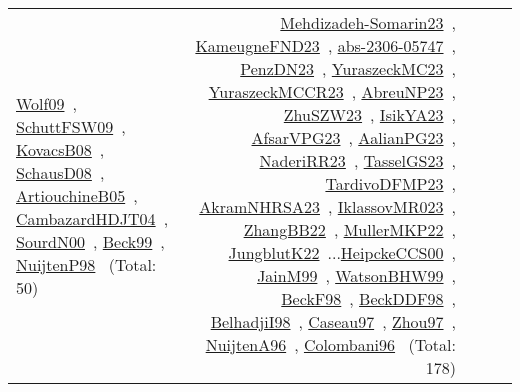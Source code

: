 {\begin{longtable}{p{3cm}r>{\raggedright\arraybackslash}p{6cm}>{\raggedright\arraybackslash}p{6cm}>{\raggedright\arraybackslash}p{8cm}}
\href{../works/Wolf09.pdf}{Wolf09}~\cite{Wolf09}, \href{../works/SchuttFSW09.pdf}{SchuttFSW09}~\cite{SchuttFSW09}, \href{../works/KovacsB08.pdf}{KovacsB08}~\cite{KovacsB08}, \href{../works/SchausD08.pdf}{SchausD08}~\cite{SchausD08}, \href{../works/ArtiouchineB05.pdf}{ArtiouchineB05}~\cite{ArtiouchineB05}, \href{../works/CambazardHDJT04.pdf}{CambazardHDJT04}~\cite{CambazardHDJT04}, \href{../works/SourdN00.pdf}{SourdN00}~\cite{SourdN00}, \href{../works/Beck99.pdf}{Beck99}~\cite{Beck99}, \href{../works/NuijtenP98.pdf}{NuijtenP98}~\cite{NuijtenP98} (Total: 50) & \href{../works/Mehdizadeh-Somarin23.pdf}{Mehdizadeh-Somarin23}~\cite{Mehdizadeh-Somarin23}, \href{../works/KameugneFND23.pdf}{KameugneFND23}~\cite{KameugneFND23}, \href{../works/abs-2306-05747.pdf}{abs-2306-05747}~\cite{abs-2306-05747}, \href{../works/PenzDN23.pdf}{PenzDN23}~\cite{PenzDN23}, \href{../works/YuraszeckMC23.pdf}{YuraszeckMC23}~\cite{YuraszeckMC23}, \href{../works/YuraszeckMCCR23.pdf}{YuraszeckMCCR23}~\cite{YuraszeckMCCR23}, \href{../works/AbreuNP23.pdf}{AbreuNP23}~\cite{AbreuNP23}, \href{../works/ZhuSZW23.pdf}{ZhuSZW23}~\cite{ZhuSZW23}, \href{../works/IsikYA23.pdf}{IsikYA23}~\cite{IsikYA23}, \href{../works/AfsarVPG23.pdf}{AfsarVPG23}~\cite{AfsarVPG23}, \href{../works/AalianPG23.pdf}{AalianPG23}~\cite{AalianPG23}, \href{../works/NaderiRR23.pdf}{NaderiRR23}~\cite{NaderiRR23}, \href{../works/TasselGS23.pdf}{TasselGS23}~\cite{TasselGS23}, \href{../works/TardivoDFMP23.pdf}{TardivoDFMP23}~\cite{TardivoDFMP23}, \href{../works/AkramNHRSA23.pdf}{AkramNHRSA23}~\cite{AkramNHRSA23}, \href{../works/IklassovMR023.pdf}{IklassovMR023}~\cite{IklassovMR023}, \href{../works/ZhangBB22.pdf}{ZhangBB22}~\cite{ZhangBB22}, \href{../works/MullerMKP22.pdf}{MullerMKP22}~\cite{MullerMKP22}, \href{../works/JungblutK22.pdf}{JungblutK22}~\cite{JungblutK22}...\href{../works/HeipckeCCS00.pdf}{HeipckeCCS00}~\cite{HeipckeCCS00}, \href{../works/JainM99.pdf}{JainM99}~\cite{JainM99}, \href{../works/WatsonBHW99.pdf}{WatsonBHW99}~\cite{WatsonBHW99}, \href{../works/BeckF98.pdf}{BeckF98}~\cite{BeckF98}, \href{../works/BeckDDF98.pdf}{BeckDDF98}~\cite{BeckDDF98}, \href{../works/BelhadjiI98.pdf}{BelhadjiI98}~\cite{BelhadjiI98}, \href{../works/Caseau97.pdf}{Caseau97}~\cite{Caseau97}, \href{../works/Zhou97.pdf}{Zhou97}~\cite{Zhou97}, \href{../works/NuijtenA96.pdf}{NuijtenA96}~\cite{NuijtenA96}, \href{../works/Colombani96.pdf}{Colombani96}~\cite{Colombani96} (Total: 178)\\

\end{longtable}}
